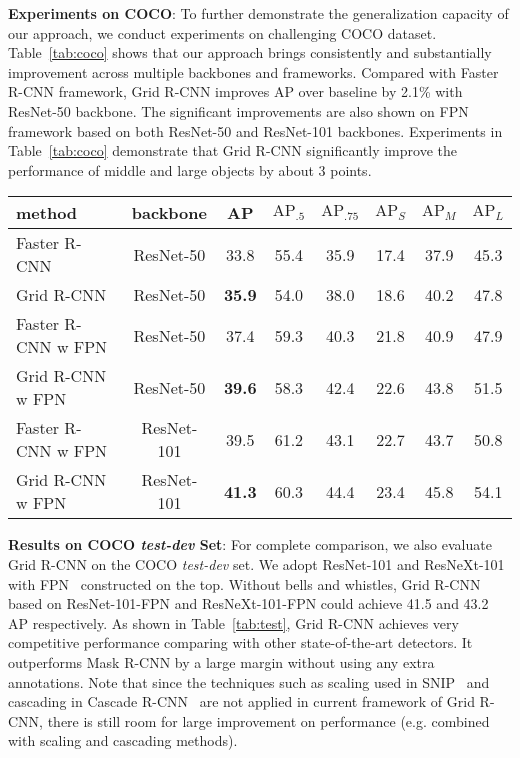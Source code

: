 \documentclass[10pt,twocolumn,letterpaper]{article}
\begin{document}
\textbf{Experiments on COCO}: To further demonstrate the generalization capacity of our approach, we conduct experiments on challenging COCO dataset. Table~\ref{tab:coco} shows that our approach brings consistently and substantially improvement across multiple backbones and frameworks. Compared with Faster R-CNN framework, Grid R-CNN improves AP over baseline by 2.1\% with ResNet-50 backbone. The significant improvements are also shown on FPN framework based on both ResNet-50 and ResNet-101 backbones. Experiments in Table~\ref{tab:coco} demonstrate that Grid R-CNN significantly improve the performance of middle and large objects by about 3 points.
\begin{table*}[t]
\begin{center}
\begin{tabular}{ l | c | c | c  c | c  c  c }
\hline
method & backbone & AP & $\text{AP}_{.5}$ & $\text{AP}_{.75}$ & $\text{AP}_{S}$ & $\text{AP}_{M}$ & $\text{AP}_{L}$ \\
\hline
Faster R-CNN & ResNet-50 & 33.8 & 55.4 & 35.9 & 17.4 & 37.9 & 45.3 \\
Grid R-CNN & ResNet-50 & \textbf{35.9} & 54.0 & 38.0 & 18.6 & 40.2 & 47.8 \\
\hline
Faster R-CNN w FPN & ResNet-50 & 37.4 & 59.3 & 40.3 & 21.8 & 40.9 & 47.9 \\
Grid R-CNN w FPN & ResNet-50 & \textbf{39.6} & 58.3 & 42.4 & 22.6 & 43.8 & 51.5 \\
\hline
Faster R-CNN w FPN & ResNet-101 & 39.5 & 61.2 & 43.1 & 22.7 & 43.7 & 50.8 \\
Grid R-CNN w FPN & ResNet-101 & \textbf{41.3} & 60.3 & 44.4 & 23.4 & 45.8 & 54.1 \\
\hline
\end{tabular}
\vspace{1mm}
\caption{Bounding box detection AP on COCO \textit{minival}. Grid R-CNN outperforms both Faster R-CNN and FPN on ResNet-50 and ResNet-101 backbone. }
\label{tab:coco}
\end{center}
\end{table*}

\textbf{Results on COCO \textit{test-dev} Set}: For complete comparison, we also evaluate Grid R-CNN on the COCO \textit{test-dev} set. We adopt ResNet-101 and ResNeXt-101~\cite{xie2017aggregated} with FPN~\cite{lin2017feature} constructed on the top. Without bells and whistles, Grid R-CNN based on ResNet-101-FPN and ResNeXt-101-FPN could achieve 41.5 and 43.2 AP respectively. As shown in Table~\ref{tab:test}, Grid R-CNN achieves very competitive performance comparing with other state-of-the-art detectors. It outperforms Mask R-CNN by a large margin without using any extra annotations. Note that since the techniques such as scaling used in SNIP~\cite{DBLP:journals/corr/abs-1711-08189} and cascading in Cascade R-CNN~\cite{cai2017cascade} are not applied in current framework of Grid R-CNN, there is still room for large improvement on performance (e.g. combined with scaling and cascading methods).
\end{document}
